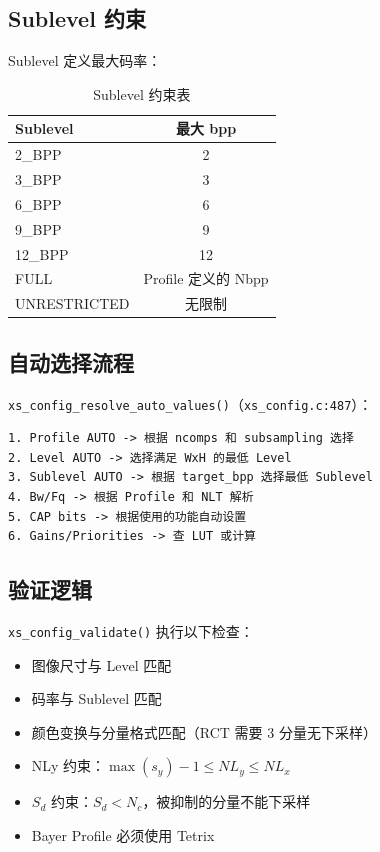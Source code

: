\subsection{Sublevel 约束}

Sublevel 定义最大码率：

\begin{table}[H]
\centering
\caption{Sublevel 约束表}
\begin{tabular}{@{}lc@{}}
\toprule
Sublevel & 最大 bpp \\
\midrule
2\_BPP & 2 \\
3\_BPP & 3 \\
6\_BPP & 6 \\
9\_BPP & 9 \\
12\_BPP & 12 \\
FULL & Profile 定义的 Nbpp \\
UNRESTRICTED & 无限制 \\
\bottomrule
\end{tabular}
\end{table}

\subsection{自动选择流程}

\texttt{xs\_config\_resolve\_auto\_values()}（\texttt{xs\_config.c:487}）：

\begin{lstlisting}[numbers=none]
1. Profile AUTO -> 根据 ncomps 和 subsampling 选择
2. Level AUTO -> 选择满足 WxH 的最低 Level
3. Sublevel AUTO -> 根据 target_bpp 选择最低 Sublevel
4. Bw/Fq -> 根据 Profile 和 NLT 解析
5. CAP bits -> 根据使用的功能自动设置
6. Gains/Priorities -> 查 LUT 或计算
\end{lstlisting}

\subsection{验证逻辑}

\texttt{xs\_config\_validate()} 执行以下检查：
\begin{itemize}
  \item 图像尺寸与 Level 匹配
  \item 码率与 Sublevel 匹配
  \item 颜色变换与分量格式匹配（RCT 需要 3 分量无下采样）
  \item NLy 约束：$\max(s_y) - 1 \leq NL_y \leq NL_x$
  \item $S_d$ 约束：$S_d < N_c$，被抑制的分量不能下采样
  \item Bayer Profile 必须使用 Tetrix
\end{itemize}

